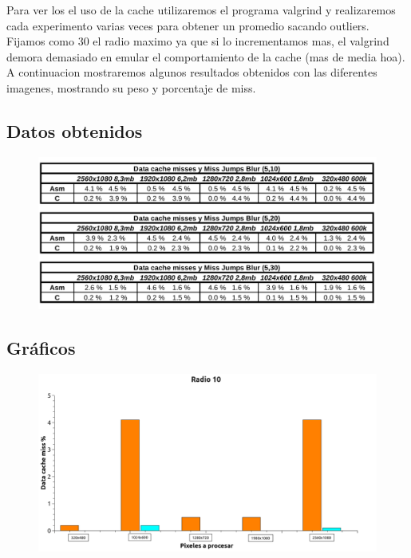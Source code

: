 Para ver los el uso de la cache utilizaremos el programa valgrind y realizaremos cada experimento varias veces para obtener un promedio sacando outliers. Fijamos como 30 el radio maximo ya que si lo incrementamos mas, el valgrind demora demasiado en emular el comportamiento de la cache (mas de media hoa). A continuacion mostraremos algunos resultados obtenidos con las diferentes imagenes, mostrando su peso y porcentaje de miss. \\

\subsection{Datos obtenidos}

\begin{figure}[H]
\begin{center}
  \includegraphics[width=\linewidth]{cache/tabla.png}
\end{center}
\end{figure}

\subsection{Gráficos} 


\begin{figure}[H]
\begin{center}
  \includegraphics[width=\linewidth]{cache/Radio10.png}
\end{center}
\end{figure}


